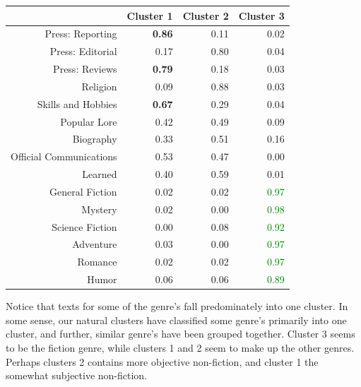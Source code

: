 \documentclass[11pt]{article}
\begin{document}
\begin{table}[ht]
\centering
\begin{tabular}{rrrr}
  \hline
 & Cluster 1 & Cluster 2 & Cluster 3 \\ 
  \hline
Press: Reporting & \bf{0.86} & 0.11 & 0.02 \\ 
  Press: Editorial & 0.17 & \textcolor{rose}{0.80} & 0.04 \\ 
  Press: Reviews & \bf{0.79} & 0.18 & 0.03 \\ 
  Religion & 0.09 & \textcolor{rose}{0.88} & 0.03 \\ 
  Skills and Hobbies & \bf{0.67} & 0.29 & 0.04 \\ 
  Popular Lore & 0.42 & 0.49 & 0.09 \\ 
  Biography & 0.33 & 0.51 & 0.16 \\ 
  Official Communications & 0.53 & 0.47 & 0.00 \\ 
  Learned & 0.40 & 0.59 & 0.01 \\ 
  General Fiction & 0.02 & 0.02 & \textcolor{green}{0.97} \\ 
  Mystery & 0.02 & 0.00 & \textcolor{green}{0.98} \\ 
  Science Fiction & 0.00 & 0.08 & \textcolor{green}{0.92} \\ 
  Adventure & 0.03 & 0.00 & \textcolor{green}{0.97} \\ 
  Romance & 0.02 & 0.02 & \textcolor{green}{0.97} \\ 
  Humor & 0.06 & 0.06 & \textcolor{green}{0.89} \\ 
   \hline
\end{tabular}
\end{table}

\noindent Notice that texts for some of the genre's fall predominately into one
cluster.  In some sense, our natural clusters have classified some genre's
primarily into one cluster, and further, similar genre's have been grouped
together. Cluster 3 seems to be the fiction genre, while clusters 1 and 2 seem
to make up the other genres. Perhaps clusters 2 contains more objective
non-fiction, and cluster 1 the somewhat subjective non-fiction.
\end{document}

